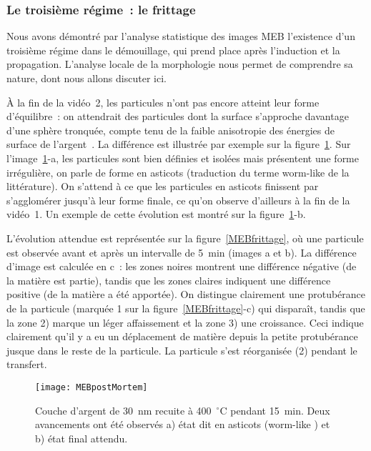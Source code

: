 \subsubsection{Le troisième régime~: le frittage}
\label{sfrittage}
Nous avons démontré par l'analyse statistique des images MEB l'existence d'un troisième régime dans le démouillage, qui prend place après l'induction et la propagation. L'analyse locale de la morphologie nous permet de comprendre sa nature, dont nous allons discuter ici.\par
À la fin de la vidéo~2, les particules n'ont pas encore atteint leur forme d'équilibre~: on attendrait des particules dont la surface s'approche davantage d'une sphère tronquée, compte tenu de la faible anisotropie des énergies de surface de l'argent~\cite{stankic2013equilibrium}. La différence est illustrée par exemple sur la figure~\ref{MEBpostMortem}. Sur l'image~\ref{MEBpostMortem}-a, les particules sont bien définies et isolées mais présentent une forme irrégulière, on parle de forme \og en asticots \fg{} (traduction du terme \og worm-like \fg{} de la littérature). On s'attend à ce que les particules en asticots finissent par s'agglomérer jusqu'à leur forme finale, ce qu'on observe d'ailleurs à la fin de la vidéo~1. Un exemple de cette évolution est montré sur la figure~\ref{MEBpostMortem}-b.\par 
L'évolution attendue est représentée sur la figure~\ref{MEBfrittage}, où une particule est observée avant et après un intervalle de 5~min (images a et b). La différence d'image est calculée en c~: les zones noires montrent une différence négative (de la matière est partie), tandis que les zones claires indiquent une différence positive (de la matière a été apportée). On distingue clairement une protubérance de la particule (marquée 1 sur la figure~\ref{MEBfrittage}-c) qui disparaît, tandis que la zone 2) marque un léger affaissement et la zone 3) une croissance. Ceci indique clairement qu'il y a eu un déplacement de matière depuis la petite protubérance jusque dans le reste de la particule. La particule s'est réorganisée (2) pendant le transfert. \par

\begin{figure}[h]
	\centering
	\texttt{[image: MEBpostMortem]}
	\caption{Couche d'argent de 30~nm recuite à 400~$^\circ$C pendant 15~min. Deux avancements ont été observés a) état dit en asticots (\og worm-like \fg) et b) état final attendu.}
	\label{MEBpostMortem}
\end{figure}

